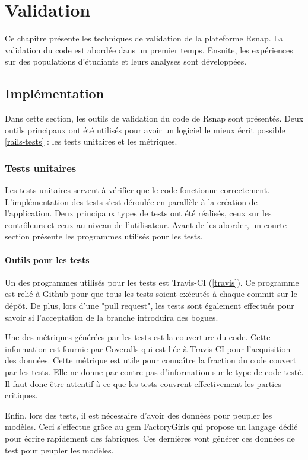 \chapter{Validation}
Ce chapitre présente les techniques de validation de la plateforme Rsnap. La validation du code est abordée dans un premier temps. Ensuite, les expériences sur des populations d'étudiants et leurs analyses sont développées.

\section{Implémentation}
Dans cette section, les outils de validation du code de Rsnap sont présentés. Deux outils principaux ont été utilisés pour avoir un logiciel le mieux écrit possible \ref{rails-tests} : les tests unitaires et les métriques.

\subsection{Tests unitaires}
Les tests unitaires servent à vérifier que le code fonctionne correctement. L'implémentation des tests s'est déroulée en parallèle à la création de l'application. Deux principaux types de tests ont été réalisés, ceux sur les contrôleurs et ceux au niveau de l'utilisateur. Avant de les aborder, un courte section présente les programmes utilisés pour les tests.

\subsubsection{Outils pour les tests}
Un des programmes utilisés pour les tests est Travis-CI (\ref{travis}). Ce programme est relié à Github pour que tous les tests soient exécutés à chaque commit sur le dépôt. De plus, lors d'une "pull request", les tests sont également effectués pour savoir si l'acceptation de la branche introduira des bogues.

Une des métriques générées par les tests est la couverture du code. Cette information est fournie par Coveralls\cite{coveralls} qui est liée à Travis-CI pour l'acquisition des données. Cette métrique est utile pour connaître la fraction du code couvert par les tests. Elle ne donne par contre pas d'information sur le type de code testé. Il faut donc être attentif à ce que les tests couvrent effectivement les parties critiques.

Enfin, lors des tests, il est nécessaire d'avoir des données pour peupler les modèles. Ceci s'effectue grâce au gem FactoryGirls \cite{factorygirls} qui propose un langage dédié pour écrire rapidement des fabriques. Ces dernières vont générer ces données de test pour peupler les modèles.


